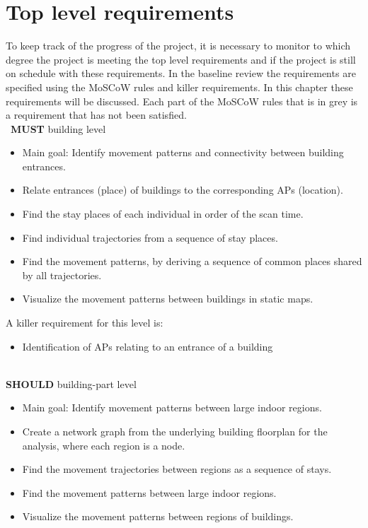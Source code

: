 \section{Top level requirements}
To keep track of the progress of the project, it is necessary to monitor to which degree the project is meeting the top level requirements and if the project is still on schedule with these requirements. In the baseline review the requirements are specified using the MoSCoW rules and killer requirements. In this chapter these requirements will be discussed. Each part of the MoSCoW rules that is in grey is a requirement that has not been satisfied. \\\
\textbf{MUST} building level
\begin{itemize}
\item Main goal: Identify movement patterns and connectivity between building entrances.
\item {\color{black!50}Relate entrances (place) of buildings to the corresponding APs (location).}
\item Find the stay places of each individual in order of the scan time.
\item Find individual trajectories from a sequence of stay places.
\item Find the movement patterns, by deriving a sequence of common places shared by all trajectories.
\item Visualize the movement patterns between buildings in static maps.
\end{itemize}
A killer requirement for this level is:
\begin{itemize}
\item {\color{black!50}Identification of APs relating to an entrance of a building}\\\\
\end{itemize}
\textbf{SHOULD} building-part level 
\begin{itemize}
\item Main goal: Identify movement patterns between large indoor regions. 
\item Create a network graph from the underlying building floorplan for the analysis, where each region is a node.
\item {\color{black!50}Find the movement trajectories between regions as a sequence of stays.}
\item Find the movement patterns between large indoor regions.
\item Visualize the movement patterns between regions of buildings.
\end{itemize}
